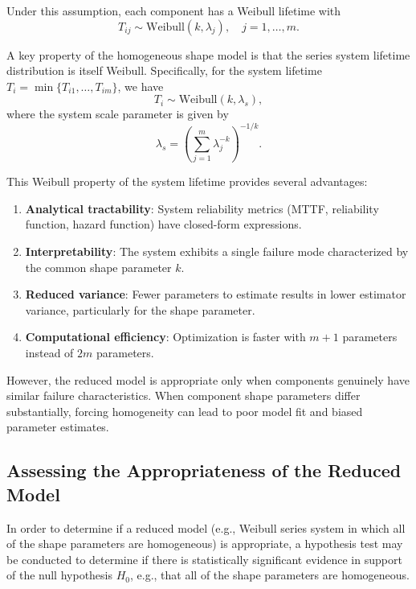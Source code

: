 \documentclass[11pt]{article}
\begin{document}
Under this assumption, each component has a Weibull lifetime with
\begin{equation}
T_{ij} \sim \text{Weibull}(k, \lambda_j), \quad j = 1, \ldots, m.
\end{equation}

A key property of the homogeneous shape model is that the series system lifetime distribution is itself Weibull. Specifically, for the system lifetime $T_i = \min\{T_{i1}, \ldots, T_{im}\}$, we have
\begin{equation}
T_i \sim \text{Weibull}\left(k, \lambda_s\right),
\end{equation}
where the system scale parameter is given by
\begin{equation}
\lambda_s = \left(\sum_{j=1}^{m} \lambda_j^{-k}\right)^{-1/k}.
\end{equation}

This Weibull property of the system lifetime provides several advantages:
\begin{enumerate}
\item \textbf{Analytical tractability}: System reliability metrics (MTTF, reliability function, hazard function) have closed-form expressions.
\item \textbf{Interpretability}: The system exhibits a single failure mode characterized by the common shape parameter $k$.
\item \textbf{Reduced variance}: Fewer parameters to estimate results in lower estimator variance, particularly for the shape parameter.
\item \textbf{Computational efficiency}: Optimization is faster with $m+1$ parameters instead of $2m$ parameters.
\end{enumerate}

However, the reduced model is appropriate only when components genuinely have similar failure characteristics. When component shape parameters differ substantially, forcing homogeneity can lead to poor model fit and biased parameter estimates.

\subsection{Assessing the Appropriateness of the Reduced Model}

In order to determine if a reduced model (e.g., Weibull series system in which all of the shape parameters are homogeneous) is appropriate, a hypothesis test may be conducted to determine if there is statistically significant evidence in support of the null hypothesis $H_0$, e.g., that all of the shape parameters are homogeneous.
\end{document}
